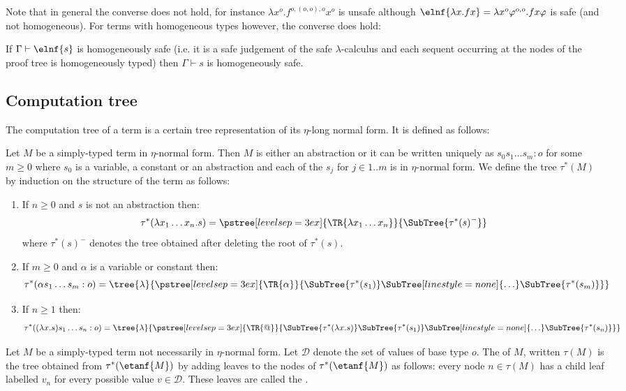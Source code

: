 Note that in general the converse does not hold, for instance $\lambda x^o . f^{o,(o,o),o} x^o$ is unsafe although $\elnf{\lambda x . f x} = \lambda x^o \varphi^{o,o} . f x \varphi$ is safe (and not homogeneous). For terms with homogeneous types however, the converse does hold:
\begin{lemma}
If $\Gamma \vdash \elnf{s}$ is homogeneously safe (i.e. it is a safe judgement of the safe $\lambda$-calculus and each sequent occurring at the nodes of the proof tree is homogeneously typed) then
$\Gamma \vdash s$ is homogeneously safe.
\end{lemma}


\subsection{Computation tree}
The computation tree of a term is a certain tree representation of its
$\eta$-long normal form. It is defined as follows:

\begin{definition}
\label{dfn:comptree} Let $M$ be a simply-typed term in $\eta$-normal
form. Then $M$ is either an abstraction or it can be written
uniquely as $s_0 s_1 \ldots s_m : o$ for some $m\geq0$ where $s_0$
is a variable, a constant or an abstraction and each of the $s_j$
for $j\in 1..m$ is in $\eta$-normal form. We define the
tree $\tau^*(M)$ by induction on the structure of the term as follows:
\begin{enumerate}[-]
\item If $n\geq0$ and $s$ is not an abstraction then:
$$ \tau^*(\lambda x_1 \ldots x_n . s) =
      \pstree[levelsep=3ex]
        { \TR{\lambda x_1 \ldots x_n} }
        { \SubTree{\tau^*(s)^{-}} }
$$
where $\tau^*(s)^{-}$ denotes the tree obtained after deleting the root of $\tau^*(s)$.

\item If $m\geq0$ and $\alpha$ is a variable or constant then:
$$ \tau^*( \alpha s_1 \ldots s_m : o) =
    \tree{\lambda}
    {
        \pstree[levelsep=3ex]
            { \TR{\alpha} }
            { \SubTree{\tau^*(s_1)} \SubTree[linestyle=none]{\ldots} \SubTree{\tau^*(s_m)}
            }
    }
$$

\item If $n \geq 1$ then:
$$ \tau^*((\lambda x.s) s_1 \ldots s_n : o) =
    \tree{\lambda}
    {
        \pstree[levelsep=3ex]
            { \TR{@} }
            {
            \SubTree{\tau^*(\lambda x.s)}    \SubTree{\tau^*(s_1)} \SubTree[linestyle=none]{\ldots} \SubTree{\tau^*(s_n)}
            }
    }
$$
\end{enumerate}

Let $M$ be a simply-typed term not necessarily in $\eta$-normal form. Let $\mathcal{D}$ denote the set of values of base type $o$. The  of $M$, written $\tau(M)$ is the tree obtained from
$\tau^*(\etanf{M})$ by adding leaves to the nodes of $\tau^*(\etanf{M})$ as follows:
every node $n \in \tau(M)$ has a child leaf labelled $v_n$ for every possible value $v \in \mathcal{D}$.
These leaves are called the .
\end{definition}

